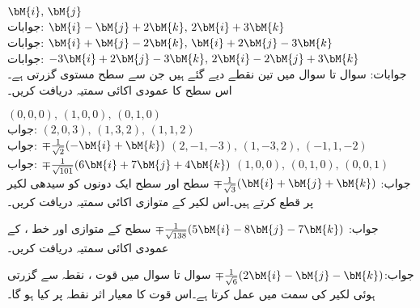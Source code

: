 \quad
$\bM{i},\,\bM{j}$\\
جوابات:
\quad
$\bM{i}-\bM{j}+2\bM{k},\, 2\bM{i}+3\bM{k}$\\
جوابات:
\quad
$\bM{i}+\bM{j}-2\bM{k},\,\bM{i}+2\bM{j}-3\bM{k}$\\
جوابات:
\quad
$-3\bM{i}+2\bM{j}-3\bM{k},\,2\bM{i}-2\bM{j}+3\bM{k}$\\
جوابات:
سوال  تا سوال  میں تین نقطے دیے گئے ہیں جن سے سطح مستوی گزرتی ہے۔اس سطح کا عمودی اکائی سمتیہ دریافت کریں۔

\quad
$(0,0,0),\, (1,0,0),\, (0,1,0)$\\
جواب:
\quad
$(2,0,3),\, (1,3,2),\, (1,1,2)$\\
جواب:
$\mp\tfrac{1}{\sqrt{2}}(-\bM{i}+\bM{k})$
\quad
$(2,-1,-3),\, (1,-3,2),\, (-1,1,-2)$\\
جواب:
$\mp\tfrac{1}{\sqrt{101}}(6\bM{i}+7\bM{j}+4\bM{k})$
\quad
$(1,0,0),\, (0,1,0),\, (0,0,1)$\\
جواب:
$\mp\tfrac{1}{\sqrt{3}}(\bM{i}+\bM{j}+\bM{k})$
سطح  اور سطح  ایک دونوں کو سیدھی لکیر پر قطع کرتے ہیں۔اس لکیر کے متوازی اکائی سمتیہ دریافت کریں۔

جواب:
$\mp\tfrac{1}{\sqrt{138}}(5\bM{i}-8\bM{j}-7\bM{k})$
سطح  کے متوازی اور خط ،  کے عمودی اکائی سمتیہ دریافت کریں۔

جواب:$\mp\tfrac{1}{\sqrt{6}}(2\bM{i}-\bM{j}-\bM{k})$
سوال  تا سوال  میں قوت ، نقطہ  سے گزرتی ہوئی لکیر کی سمت میں عمل کرتا ہے۔اس قوت کا معیار اثر   نقطہ  پر کیا ہو گا۔

